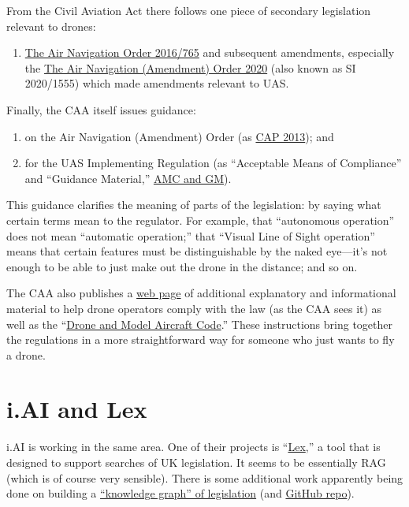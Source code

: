\documentclass[12pt, a4paper]{article}
\begin{document}
From the Civil Aviation Act there follows one piece of secondary
legislation relevant to drones:
\begin{enumerate}
\item \href{https://www.legislation.gov.uk/uksi/2016/765/contents}{The
    Air Navigation Order 2016/765} and subsequent amendments,
  especially the
  \href{https://www.legislation.gov.uk/uksi/2020/1555/contents/made}{The
    Air Navigation (Amendment) Order 2020} (also known as SI
  2020/1555) which made amendments relevant to UAS.\@
\end{enumerate}

Finally, the CAA itself issues guidance:
\begin{enumerate}
\item on the Air Navigation (Amendment) Order (as
  \href{https://www.caa.co.uk/our-work/publications/documents/content/cap2013/}{CAP
    2013}); and
\item for the UAS Implementing Regulation (as ``Acceptable Means of Compliance'' and ``Guidance
  Material,'' \href{https://regulatorylibrary.caa.co.uk/2019-947/Content/UAS947_1.htm}{AMC
    and GM}).
\end{enumerate}

This guidance clarifies the meaning of parts of the legislation: by
saying what certain terms mean to the regulator. For example, that
``autonomous operation'' does not mean ``automatic operation;'' that
``Visual Line of Sight operation'' means that certain features must be
distinguishable by the naked eye---it's not enough to be able to just
make out the drone in the distance; and so on.

The CAA also publishes a \href{https://www.caa.co.uk/drones/}{web
  page} of additional explanatory and informational material to help
drone operators comply with the law (as the CAA sees it) as well as
the ``\href{https://register-drones.caa.co.uk/drone-code}{Drone and
  Model Aircraft Code}.'' These instructions bring together the
regulations in a more straightforward way for someone who just wants
to fly a drone.

\appendix
\section{i.AI and Lex}

i.AI is working in the same area. One of their projects is
``\href{https://ai.gov.uk/projects/parlex-and-lex/}{Lex},'' a tool
that is designed to support searches of UK legislation. It seems to be
essentially RAG (which is of course very sensible). There is some
additional work apparently being done on building a
\href{https://ai.gov.uk/blogs/understanding-legislative-networks-building-a-knowledge-graph-of-uk-legislation/}{``knowledge
  graph'' of legislation} (and
\href{https://ai.gov.uk/blogs/understanding-legislative-networks-building-a-knowledge-graph-of-uk-legislation/}{GitHub
  repo}).
\end{document}
